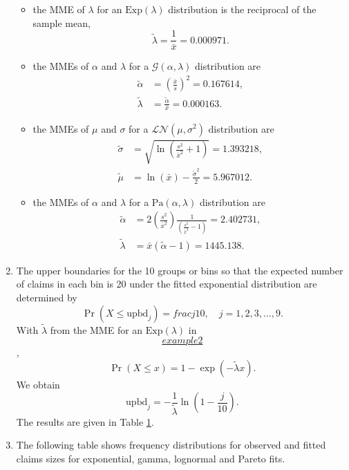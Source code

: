 \documentclass[
]{book}
\theoremstyle{definition}
\theoremstyle{definition}
\theoremstyle{definition}
\theoremstyle{definition}
\theoremstyle{remark}
\begin{document}
\begin{enumerate}
  \begin{itemize}
  \item
    the MME of \(\lambda\) for an \(\text{Exp}(\lambda)\) distribution
    is the reciprocal of the sample mean,
    \[\tilde{\lambda} = \frac{1}{\bar{x}} = 0.000971.\]
  \item
    the MMEs of \(\alpha\) and \(\lambda\) for a
    \(\mathcal{G}(\alpha, \lambda)\) distribution are
    \[\begin{aligned}
    \tilde{\alpha} &= \left(\frac{\bar{x}}{s}\right)^2 = 0.167614, \\
    \tilde{\lambda} &= \frac{\tilde{\alpha}}{\bar{x}} = 0.000163.\end{aligned}\]
  \item
    the MMEs of \(\mu\) and \(\sigma\) for a
    \(\mathcal{LN}(\mu, \sigma^2)\) distribution are \[\begin{aligned}
    \tilde{\sigma} &= \sqrt{ \ln \left(  \frac{s^2}{\bar{x}^2} + 1 \right)  }  = 1.393218, \\
    \tilde{\mu} &= \ln(\bar{x}) - \frac{\tilde{\sigma}^2 }{2} = 5.967012.\end{aligned}\]
  \item
    the MMEs of \(\alpha\) and \(\lambda\) for a
    \(\text{Pa}(\alpha, \lambda)\) distribution are \[\begin{aligned}
    \tilde{\alpha} &= \displaystyle{ 2 \left(  \frac{s^2}{\bar{x}^2} \right) \frac{1}{(\frac{s^2}{\bar{x}^2} - 1)}   } = 2.402731,\\
    \tilde{\lambda} &= \bar{x} (\tilde{\alpha} - 1) = 1445.138.\end{aligned}\]
  \end{itemize}
\item
  The upper boundaries for the 10 groups or bins so that the expected
  number of claims in each bin is 20 under the fitted exponential
  distribution are determined by
  \[\Pr(X \le \text{upbd}_j) = frac{j}{10}, \quad j = 1,2,3, \ldots, 9.\]
  With \(\tilde{\lambda}\) from the MME for an \(\text{Exp}(\lambda)\) in
  \protect\hyperlink{example2}{\[example2\]},
  \[\Pr(X \le x)  = 1 - \exp(-\tilde{\lambda} x).\] We obtain
  \[\text{upbd}_j = -\frac{1}{\tilde{\lambda}} \ln\left( 1 - \frac{j}{10}\right).\]
  The results are given in Table
  \protect\hyperlink{tableFitted}{1}.
\item
  The following table shows frequency distributions for observed and
  fitted claims sizes for exponential, gamma, lognormal and Pareto
  fits.


\end{enumerate}
\end{document}
